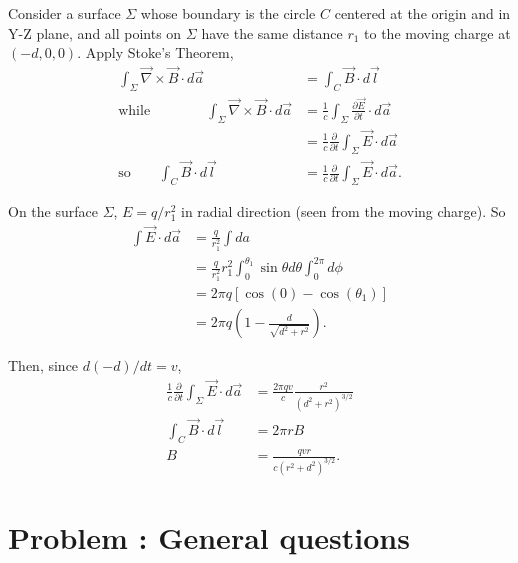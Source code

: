 \documentclass[solutions]{esg8022pset}
\begin{document}
\begin{enumerate}[(a)]
      Consider a surface $\Sigma$ whose boundary is the circle $C$ centered
      at the origin and in Y-Z plane, and all points on $\Sigma$ have the
      same distance $r_1$ to the moving charge at $(-d,0,0)$.  Apply Stoke's
      Theorem,
      \begin{align}
        \int_{\Sigma} \vec{\nabla}\times\vec{B}\cdot d\vec{a} &= \int_C
          \vec{B}\cdot d\vec{l}\\
        \text{while} \qquad\qquad \int_{\Sigma} \vec{\nabla}\times\vec{B}\cdot
        d\vec{a} &= \frac{1}{c}\int_{\Sigma} \frac{\partial \vec{E}}{\partial
          t}\cdot d\vec{a}\nonumber\\
        &= \frac{1}{c}\frac{\partial}{\partial t}\int_{\Sigma} \vec{E}\cdot
          d\vec{a}\\
        \text{so}\qquad \int_C \vec{B}\cdot d\vec{l} &=
          \frac{1}{c}\frac{\partial}{\partial t}\int_{\Sigma} \vec{E}\cdot
          d\vec{a}.
      \end{align}

      On the surface $\Sigma$, $E=q/r_1^2$ in radial direction (seen from
      the moving charge).  So
      \begin{align}
        \int \vec{E}\cdot d\vec{a} &= \frac{q}{r_1^2}\int da\nonumber\\
        &= \frac{q}{r_1^2}r_1^2\int_{0}^{\theta_1}\sin\theta d\theta
        \int_0^{2\pi}d\phi\nonumber\\
        &= 2\pi q\left[\cos(0) - \cos(\theta_1)\right]\nonumber\\
        &= 2\pi q(1-\frac{d}{\sqrt{d^2+r^2}}).
      \end{align}

      Then, since $d(-d)/dt=v$,
      \begin{align}
        \frac{1}{c}\frac{\partial}{\partial t}\int_{\Sigma} \vec{E}\cdot
        d\vec{a} &= \frac{2\pi qv}{c}\frac{r^2}{(d^2+r^2)^{3/2}}\\
        \int_C \vec{B}\cdot d\vec{l} &= 2\pi rB\\
        B&= \frac{qvr}{c(r^2+d^2)^{3/2}}.
      \end{align}
  \end{enumerate}
\section{Problem \thesection: General questions}
\end{document}
